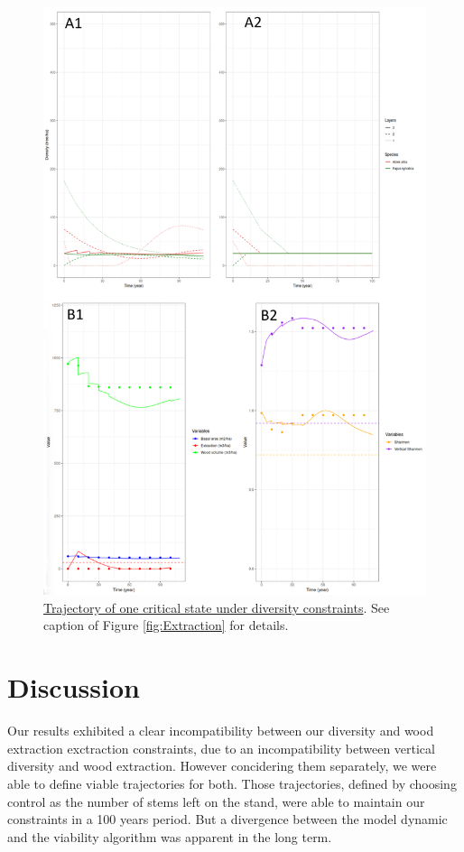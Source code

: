 \documentclass{article}
\begin{document}
\begin{figure}[b]
    \centering
    \includegraphics[height=0.9\textheight]{Figure/Results/Diversity.png}
    \caption{\underline{Trajectory of one critical state under diversity constraints}. See caption of Figure \ref{fig:Extraction} for details.}
    \label{fig:Diversity}
\end{figure}

\clearpage

\section{Discussion}

Our results exhibited a clear incompatibility between our diversity and wood extraction exctraction constraints, due to an incompatibility between vertical diversity and wood extraction. However concidering them separately, we were able to define viable trajectories for both. Those trajectories, defined by choosing control as the number of stems left on the stand, were able to maintain our constraints in a 100 years period. But a divergence between the model dynamic and the viability algorithm was apparent in the long term.
\end{document}
